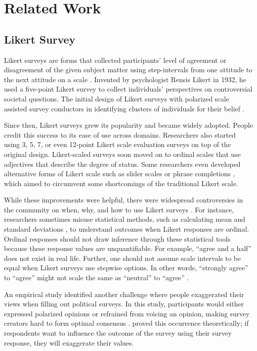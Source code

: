 \section{Related Work} \label{related_works}

\subsection{Likert Survey}
Likert surveys are forms that collected participants' level of agreement or disagreement of the given subject matter using step-intervals from one attitude to the next attitude on a scale \cite{likert1932technique}. Invented by psychologist Rensis Likert in 1932, he used a five-point Likert survey to collect individuals' perspectives on controversial societal questions. The initial design of Likert surveys with polarized scale assisted survey conductors in identifying clusters of individuals for their belief \cite{joshi2015likert}. 

Since then, Likert surveys grew its popularity and became widely adopted. People credit this success to its ease of use across domains. Researchers also started using 3, 5, 7, or even 12-point Likert scale evaluation surveys \cite{garland2008computer,finstad2010} on top of the original design. Likert-scaled surveys soon moved on to ordinal scales that use adjectives that describe the degree of status. Some researchers even developed alternative forms of Likert scale such as slider scales \cite{roster2015exploring} or phrase completions \cite{hodge2003phrase}, which aimed to circumvent some shortcomings of the traditional Likert scale.

While these improvements were helpful, there were widespread controversies in the community on when, why, and how to use Likert surveys \cite{bishop2015use}. For instance, researchers sometimes misuse statistical methods, such as calculating mean and standard deviations \cite{jamieson2004likert}, to understand outcomes when Likert responses are ordinal. Ordinal responses should not draw inference through these statistical tools because these response values are unquantifiable. For example, ``agree and a half'' does not exist in real life. Further, one should not assume scale intervals to be equal when Likert surveys use stepwise options. In other words, ``strongly agree'' to ``agree'' might not scale the same as ``neutral'' to ``agree'' \cite{jamieson2004likert, edmondson2005likert}.

An empirical study \cite{quarfoot2017quadratic} identified another challenge where people exaggerated their views when filling out political surveys. In this study, participants would either expressed polarized opinions or refrained from voicing an opinion, making survey creators hard to form optimal consensus \cite{posner2018radical}. \textcite{cavaille2018towards}  proved this occurrence theoretically; if respondents want to influence the outcome of the survey using their survey response, they will exaggerate their values.

